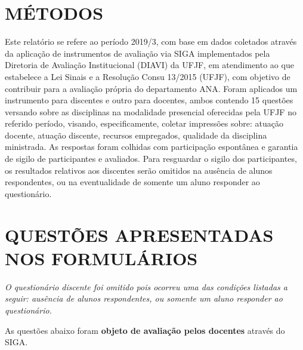 \documentclass[a4paper,10pt]{article}
\begin{document}
\section{MÉTODOS}
Este relatório se refere ao período 2019/3, com base em dados     coletados através da aplicação de instrumentos de avaliação via SIGA     implementados pela Diretoria de Avaliação Institucional (DIAVI) da UFJF, em atendimento     ao que estabelece a Lei Sinais e a Resolução Consu 13/2015 (UFJF),     com objetivo de contribuir para a avaliação própria do departamento ANA.    Foram aplicados um instrumento para discentes e outro para docentes, ambos contendo     15 questões versando sobre as disciplinas na modalidade presencial oferecidas pela UFJF no     referido período, visando, especificamente, coletar impressões sobre: atuação docente, atuação discente,     recursos empregados, qualidade da disciplina ministrada.     As respostas foram colhidas      com participação espontânea e garantia de    sigilo de participantes e avaliados. Para resguardar o sigilo dos participantes, os resultados relativos aos discentes serão omitidos na ausência de alunos respondentes, ou na eventualidade de somente um aluno responder ao questionário.
\section{QUESTÕES APRESENTADAS NOS FORMULÁRIOS}
{ \it O questionário discente foi omitido pois ocorreu uma das condições listadas a seguir: ausência de alunos respondentes, ou somente um aluno responder ao questionário.}

As questões abaixo foram {\bf objeto de avaliação pelos docentes} através do SIGA.
\end{document}
